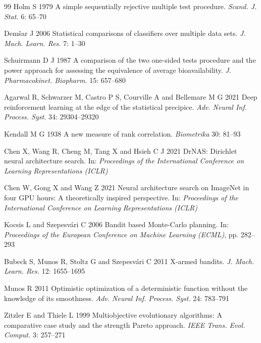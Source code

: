 \documentclass{sadhana}
\begin{document}
\begin{thebibliography}{99}
 Holm S 1979 A simple sequentially rejective multiple test procedure. \textit{Scand. J. Stat.} 6: 65--70

 Dem\v{s}ar J 2006 Statistical comparisons of classifiers over multiple data sets. \textit{J. Mach. Learn. Res.} 7: 1--30

 Schuirmann D J 1987 A comparison of the two one-sided tests procedure and the power approach for assessing the equivalence of average bioavailability. \textit{J. Pharmacokinet. Biopharm.} 15: 657--680

 Agarwal R, Schwarzer M, Castro P S, Courville A and Bellemare M G 2021 Deep reinforcement learning at the edge of the statistical precipice. \textit{Adv. Neural Inf. Process. Syst.} 34: 29304--29320

 Kendall M G 1938 A new measure of rank correlation. \textit{Biometrika} 30: 81--93

 Chen X, Wang R, Cheng M, Tang X and Hsieh C J 2021 DrNAS: Dirichlet neural architecture search. In: \textit{Proceedings of the International Conference on Learning Representations (ICLR)}

 Chen W, Gong X and Wang Z 2021 Neural architecture search on ImageNet in four GPU hours: A theoretically inspired perspective. In: \textit{Proceedings of the International Conference on Learning Representations (ICLR)}

 Kocsis L and Szepesv\'{a}ri C 2006 Bandit based Monte-Carlo planning. In: \textit{Proceedings of the European Conference on Machine Learning (ECML)}, pp. 282--293

 Bubeck S, Munos R, Stoltz G and Szepesv\'{a}ri C 2011 X-armed bandits. \textit{J. Mach. Learn. Res.} 12: 1655--1695

 Munos R 2011 Optimistic optimization of a deterministic function without the knowledge of its smoothness. \textit{Adv. Neural Inf. Process. Syst.} 24: 783--791

 Zitzler E and Thiele L 1999 Multiobjective evolutionary algorithms: A comparative case study and the strength Pareto approach. \textit{IEEE Trans. Evol. Comput.} 3: 257--271

\end{thebibliography}
\end{document}
